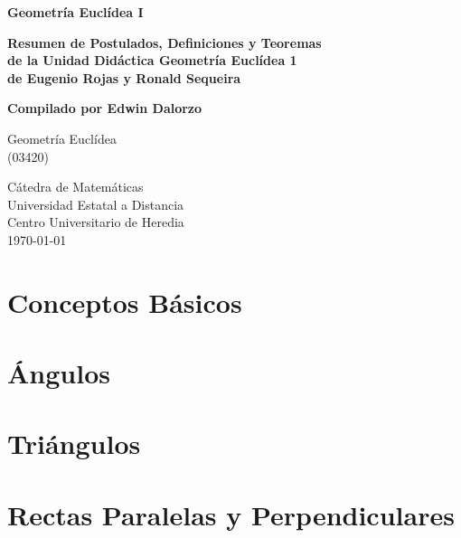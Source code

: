 \documentclass[12pt,titlepage]{article}
\theoremstyle{plain}
\theoremstyle{definition}
\theoremstyle{remark}
\begin{document}
\begin{titlepage}
   \begin{center}
       \vspace*{1cm}

       \Large \textbf{Geometría Euclídea I}
       
       \vspace{2.5cm}
       
       \small{\textbf{Resumen de Postulados, Definiciones y Teoremas\\de la Unidad Didáctica Geometría Euclídea 1\\de Eugenio Rojas y Ronald Sequeira}}

       \vspace{2.5cm}

       \textbf{Compilado por Edwin Dalorzo}

       \vfill
            
       Geometría Euclídea \\
       (03420)
                   
       \vspace{0.8cm}
            
       Cátedra de Matemáticas \\ Universidad Estatal a Distancia \\ Centro Universitario de Heredia \\ \today \end{center}
\end{titlepage}

\clearpage
\tableofcontents
\clearpage

\section{Conceptos Básicos}


\clearpage

\section{Ángulos}


\clearpage

\section{Triángulos}


\clearpage

\section{Rectas Paralelas y Perpendiculares}

\end{document}
